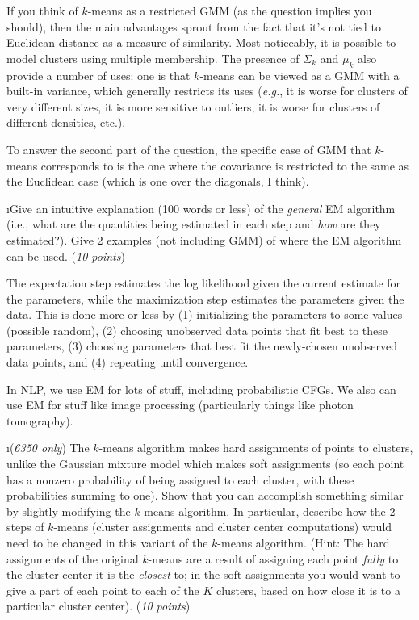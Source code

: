 \documentclass[fleqn]{article}
\begin{document}
\begin{solution}
If you think of $k$-means as a restricted GMM (as the question implies you should), then the main advantages sprout from the fact that it's not tied to Euclidean distance as a measure of similarity. Most noticeably, it is possible to model clusters using multiple membership. The presence of $\Sigma_k$ and $\mu_k$ also provide a number of uses: one is that $k$-means can be viewed as a GMM with a built-in variance, which generally restricts its uses (\textit{e.g.}, it is worse for clusters of very different sizes, it is more sensitive to outliers, it is worse for clusters of different densities, etc.).

To answer the second part of the question, the specific case of GMM that $k$-means corresponds to is the one where the covariance is restricted to the same as the Euclidean case (which is one over the diagonals, I think).
\end{solution}

\i Give an intuitive explanation  (100 words or less) of the \textit{general} 
EM algorithm (i.e., what are the quantities being estimated in each step and 
\textit{how} are they estimated?). Give 2 examples (not including GMM) of where the 
EM algorithm can be used. (\textit{10 points}) 

\begin{solution}
The expectation step estimates the log likelihood given the current estimate for the parameters, while the maximization step estimates the parameters given the data. This is done more or less by (1) initializing the parameters to some values (possible random), (2) choosing unobserved data points that fit best to these parameters, (3) choosing parameters that best fit the newly-chosen unobserved data points, and (4) repeating until convergence.

In NLP, we use EM for lots of stuff, including probabilistic CFGs. We also can use EM for stuff like image processing (particularly things like photon tomography).
\end{solution}

\i (\textit{6350 only}) The $k$-means algorithm makes hard assignments of 
points to clusters, unlike the Gaussian mixture model which makes soft assignments
(so each point has a nonzero probability of being assigned to each cluster, 
with these probabilities summing to one). Show that you can accomplish something 
similar by slightly modifying the $k$-means algorithm. In particular, describe how 
the 2 steps of $k$-means (cluster assignments and cluster center computations) would 
need to be changed in this variant of the $k$-means algorithm. (Hint: The hard 
assignments of the original $k$-means are a result of assigning each point 
\textit{fully} to the cluster center it is the \textit{closest} to; in the soft 
assignments you would  want to give a part of each point to each of the $K$ clusters, 
based on how close it is to a particular cluster center). (\textit{10 points})
\end{document}
